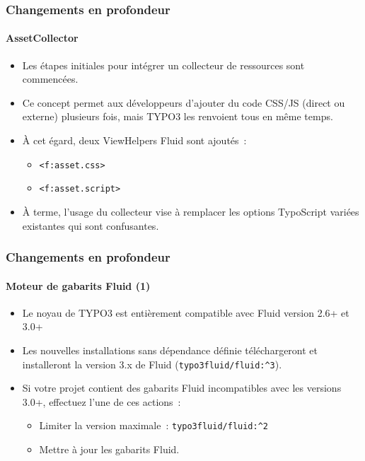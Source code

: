 
\begin{frame}[fragile]
	\frametitle{Changements en profondeur}
	\framesubtitle{AssetCollector}

	\begin{itemize}
		\item Les étapes initiales pour intégrer un collecteur de ressources sont commencées.
		\item Ce concept permet aux développeurs d'ajouter du code CSS/JS (direct ou externe)
			plusieurs fois, mais TYPO3 les renvoient tous en même temps.
		\item À cet égard, deux ViewHelpers Fluid sont ajoutés~:
			\begin{itemize}
				\item \texttt{<f:asset.css>}
				\item \texttt{<f:asset.script>}
			\end{itemize}
		\item À terme, l'usage du collecteur vise à remplacer les options TypoScript
			variées existantes qui sont confusantes.
	\end{itemize}

\end{frame}


\begin{frame}[fragile]
	\frametitle{Changements en profondeur}
	\framesubtitle{Moteur de gabarits Fluid (1)}

	\begin{itemize}
		\item Le noyau de TYPO3 est entièrement compatible avec Fluid version 2.6+ et 3.0+
		\item Les nouvelles installations sans dépendance définie téléchargeront et installeront
			la version 3.x de Fluid (\texttt{typo3fluid/fluid:\^{}3}).
		\item Si votre projet contient des gabarits Fluid incompatibles avec les versions 3.0+,
			effectuez l'une de ces actions~:

			\begin{itemize}
				\item Limiter la version maximale~: \texttt{typo3fluid/fluid:\^{}2}
				\item Mettre à jour les gabarits Fluid.
			\end{itemize}

	\end{itemize}

\end{frame}

